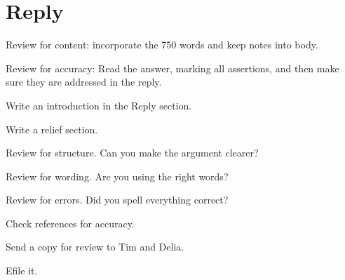\documentclass[12pt,\documentclassflag]{michiganCourtOfAppealsBrief}
\begin{document}





\newpage
\pagestyle{plain}


\section{Reply}

\begin{todolist}
\item Review for content: incorporate the 750 words and keep notes into body.
\item Review for accuracy: Read the answer, marking all assertions, and then make sure they are addressed in the reply.
\item Write an introduction in the Reply section.
\item Write a relief section.
\item Review for structure. Can you make the argument clearer?
\item Review for wording. Are you using the right words?
\item Review for errors. Did you spell everything correct? 
\item Check references for accuracy.
\item Send a copy for review to Tim and Delia.
\item Efile it.
\end{todolist}
\end{document}
